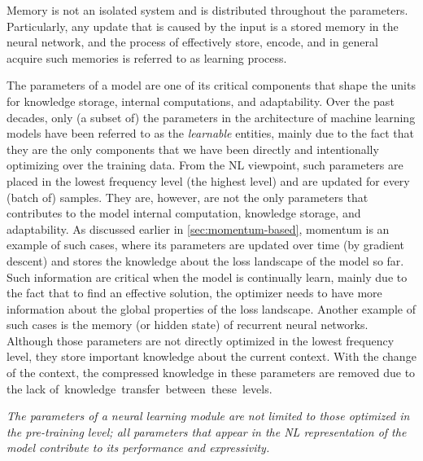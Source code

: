 \documentclass{article}
\newcommand{\headred}[1]{\vspace{1.7mm}\noindent{{\textcolor{c5}{\bf #1.}}}}
\begin{document}
{\begin{myboxismall}  
    Memory is not an isolated system and is distributed throughout the parameters. Particularly, any update that is caused by the input is a stored memory in the neural network, and the process of effectively store, encode, and in general acquire such memories is referred to as learning process. 
\end{myboxismall}

\headred{A General Note on Parameters of a Model}
The parameters of a model are one of its critical components that shape the units for knowledge storage, internal computations, and adaptability. 
Over the past decades, only (a subset of) the parameters in the architecture of machine learning models have been referred to as the \emph{learnable} entities, mainly due to the fact that they are the only components that we have been directly and intentionally optimizing over the training data. From the NL viewpoint, such parameters are placed in the lowest frequency level (the highest level) and are updated for every (batch of) samples. They are, however, are not the only parameters that contributes to the model internal computation, knowledge storage, and adaptability. As discussed earlier in \autoref{sec:momentum-based}, momentum is an example of such cases, where its parameters are updated over time (by gradient descent) and stores the knowledge about the loss landscape of the model so far. Such information are critical when the model is continually learn, mainly due to the fact that to find an effective solution, the optimizer needs to have more information about the global properties of the loss landscape. Another example of such cases is the memory (or hidden state) of recurrent neural networks. Although those parameters are not directly optimized in the lowest frequency level, they store important knowledge about the current context. With the change of the context, the compressed knowledge in these parameters are removed due to the lack of~knowledge~transfer~between~these~levels.    

\begin{myboxismall}  
    \textit{The parameters of a neural learning module are not limited to those optimized in the pre-training level; all parameters that appear in the NL representation of the model contribute to its performance and expressivity.}
\end{myboxismall}

}
\end{document}
